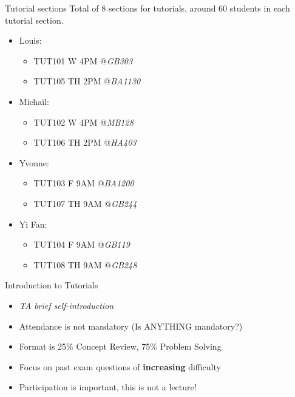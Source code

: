 



\begin{frame}[plain]
    \titlepage

\end{frame}
\begin{frame}{Tutorial sections}
    Total of 8 sections for tutorials, around 60 students in each tutorial section.
    \begin{itemize}
        \item Louis:
        \begin{itemize}
            \item TUT101 W 4PM @\textit{GB303}
            \item TUT105 TH 2PM @\textit{BA1130}
        \end{itemize}
        \item Michail:
        \begin{itemize}
            \item TUT102 W 4PM @\textit{MB128}
            \item TUT106 TH 2PM @\textit{HA403} 
        \end{itemize}
        \item Yvonne:
        \begin{itemize}
            \item TUT103 F 9AM @\textit{BA1200}
            \item TUT107 TH 9AM @\textit{GB244} 
        \end{itemize}
        \item Yi Fan:
        \begin{itemize}
            \item TUT104 F 9AM @\textit{GB119}
            \item TUT108 TH 9AM @\textit{GB248} 
        \end{itemize}
    \end{itemize}
\end{frame}
    

\begin{frame}{Introduction to Tutorials}
    \begin{itemize}
        \item \textit{TA brief self-introduction}
        \item Attendance is not mandatory (Is ANYTHING mandatory?)
        \item Format is 25\% Concept Review, 75\% Problem Solving
        \item Focus on past exam questions of \textbf{increasing} difficulty
        \item Participation is important, this is not a lecture!
    \end{itemize}
\end{frame}

